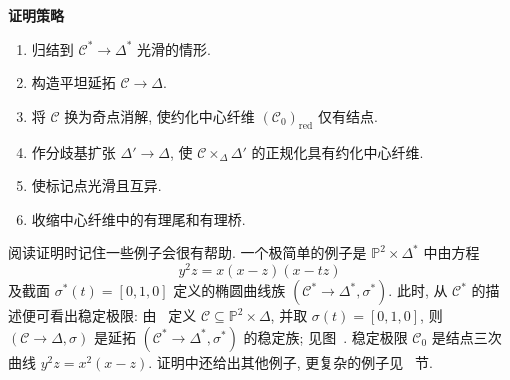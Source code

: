 \noindent\textbf{证明策略}
\begin{enumerate}[(1)]
\item 归结到 $\mathcal C^*\to\Delta^*$ 光滑的情形.
\item 构造平坦延拓 $\mathcal C\to\Delta$.
\item 将 $\mathcal C$ 换为奇点消解, 使约化中心纤维 $(\mathcal C_0)_{\mathrm{red}}$ 仅有结点.
\item 作分歧基扩张 $\Delta'\to\Delta$, 使 $\mathcal C\times_\Delta\Delta'$ 的正规化具有约化中心纤维.
\item 使标记点光滑且互异.
\item 收缩中心纤维中的有理尾和有理桥.
\end{enumerate}
阅读证明时记住一些例子会很有帮助. 一个极简单的例子是 $\mathbb P^2\times\Delta^*$ 中由方程
\begin{equation}\label{src:6.5.3}
y^2z=x(x-z)(x-tz)
\end{equation}
及截面 $\sigma^*(t)=[0,\allowbreak 1,\allowbreak 0]$ 定义的椭圆曲线族 $(\mathcal C^*\to\Delta^*,\allowbreak \sigma^*)$. 此时, 从 $\mathcal C^*$ 的描述便可看出稳定极限: 由~ 定义 $\mathcal C\subseteq\mathbb P^2\times\Delta$, 并取 $\sigma(t)=[0,\allowbreak 1,\allowbreak 0]$, 则 $(\mathcal C\to\Delta,\allowbreak \sigma)$ 是延拓 $(\mathcal C^*\to\Delta^*,\allowbreak \sigma^*)$ 的稳定族; 见图~. 稳定极限 $\mathcal C_0$ 是结点三次曲线 $y^2z=x^2(x-z)$. 证明中还给出其他例子, 更复杂的例子见~ 节.

